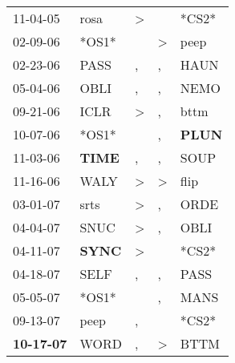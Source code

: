 \begin{supertabular}{p{0.07\textwidth}p{0.06\textwidth}p{0.02\textwidth}p{0.02\textwidth}p{0.06\textwidth}}
          11-04-05\textsuperscript{} &           rosa\textsuperscript{} &     \textgreater &               &                            *CS2* \\
          02-09-06\textsuperscript{} &                            *OS1* &                  &  \textgreater &           peep\textsuperscript{} \\
          02-23-06\textsuperscript{} &           PASS\textsuperscript{} &                , &             , &           HAUN\textsuperscript{} \\
          05-04-06\textsuperscript{} &           OBLI\textsuperscript{} &                , &             , &           NEMO\textsuperscript{} \\
          09-21-06\textsuperscript{} &           ICLR\textsuperscript{} &     \textgreater &             , &           bttm\textsuperscript{} \\
          10-07-06\textsuperscript{} &                            *OS1* &                  &             , &  \textbf{PLUN\textsuperscript{}} \\
          11-03-06\textsuperscript{} &  \textbf{TIME\textsuperscript{}} &                , &             , &           SOUP\textsuperscript{} \\
          11-16-06\textsuperscript{} &           WALY\textsuperscript{} &     \textgreater &  \textgreater &           flip\textsuperscript{} \\
          03-01-07\textsuperscript{} &           srts\textsuperscript{} &     \textgreater &             , &           ORDE\textsuperscript{} \\
          04-04-07\textsuperscript{} &           SNUC\textsuperscript{} &     \textgreater &             , &           OBLI\textsuperscript{} \\
          04-11-07\textsuperscript{} &  \textbf{SYNC\textsuperscript{}} &     \textgreater &               &                            *CS2* \\
          04-18-07\textsuperscript{} &           SELF\textsuperscript{} &                , &             , &           PASS\textsuperscript{} \\
          05-05-07\textsuperscript{} &                            *OS1* &                  &             , &           MANS\textsuperscript{} \\
          09-13-07\textsuperscript{} &           peep\textsuperscript{} &                , &               &                            *CS2* \\
 \textbf{10-17-07\textsuperscript{}} &           WORD\textsuperscript{} &                , &  \textgreater &           BTTM\textsuperscript{} \\

\end{supertabular}
